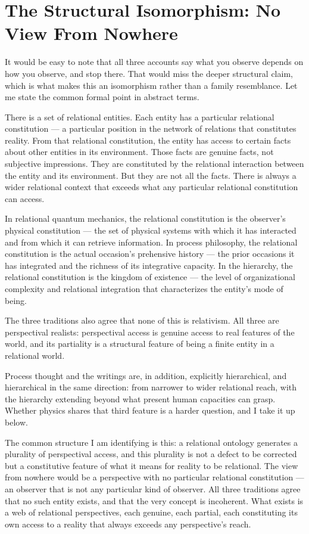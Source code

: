 \section{The Structural Isomorphism: No View From Nowhere}
\label{sec:ch9-convergence}

It would be easy to note that all three accounts say what you observe depends on how you observe, and stop there.
That would miss the deeper structural claim, which is what makes this an isomorphism rather than a family resemblance.
Let me state the common formal point in abstract terms.

There is a set of relational entities.
Each entity has a particular relational constitution --- a particular position in the network of relations that constitutes reality.
From that relational constitution, the entity has access to certain facts about other entities in its environment.
Those facts are genuine facts, not subjective impressions.
They are constituted by the relational interaction between the entity and its environment.
But they are not all the facts.
There is always a wider relational context that exceeds what any particular relational constitution can access.

In relational quantum mechanics, the relational constitution is the observer's physical constitution --- the set of physical systems with which it has interacted and from which it can retrieve information.
In process philosophy, the relational constitution is the actual occasion's prehensive history --- the prior occasions it has integrated and the richness of its integrative capacity.
In the \bahai hierarchy, the relational constitution is the kingdom of existence --- the level of organizational complexity and relational integration that characterizes the entity's mode of being.

The three traditions also agree that none of this is relativism.
All three are perspectival realists: perspectival access is genuine access to real features of the world, and its partiality is a structural feature of being a finite entity in a relational world.

Process thought and the \bahai writings are, in addition, explicitly hierarchical, and hierarchical in the same direction: from narrower to wider relational reach, with the hierarchy extending beyond what present human capacities can grasp.
Whether physics shares that third feature is a harder question, and I take it up below.

The common structure I am identifying is this: a relational ontology generates a plurality of perspectival access, and this plurality is not a defect to be corrected but a constitutive feature of what it means for reality to be relational.
The view from nowhere would be a perspective with no particular relational constitution --- an observer that is not any particular kind of observer.
All three traditions agree that no such entity exists, and that the very concept is incoherent.
What exists is a web of relational perspectives, each genuine, each partial, each constituting its own access to a reality that always exceeds any perspective's reach.

